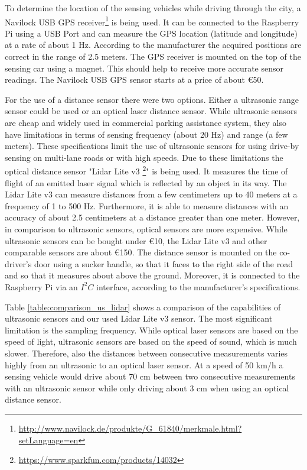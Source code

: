 To determine the location of the sensing vehicles while driving through the city, a Navilock USB GPS receiver\footnote{\url{http://www.navilock.de/produkte/G_61840/merkmale.html?setLanguage=en}} is being used. It can be connected to the Raspberry Pi using a USB Port and can measure the GPS location (latitude and longitude) at a rate of about 1 Hz. According to the manufacturer the acquired positions are correct in the range of 2.5 meters. The GPS receiver is mounted on the top of the sensing car using a magnet. This should help to receive more accurate sensor readings. The Navilock USB GPS sensor starts at a price of about \euro{50}.

For the use of a distance sensor there were two options. Either a ultrasonic range sensor could be used or an optical laser distance sensor. While ultrasonic sensors are cheap and widely used in commercial parking assistance system, they also have limitations in terms of sensing frequency (about 20 Hz) and range (a few meters). These specifications limit the use of ultrasonic sensors for using drive-by sensing on multi-lane roads or with high speeds.   Due to these limitations the optical distance sensor "Lidar Lite v3 \footnote{\url{https://www.sparkfun.com/products/14032}}" is being used. It measures the time of flight of an emitted laser signal which is reflected by an object in its way. The Lidar Lite v3 can measure distances from a few centimeters up to 40 meters at a frequency of 1 to 500 Hz. Furthermore, it is able to measure distances with an accuracy of about 2.5 centimeters at a distance greater than one meter. However, in comparison to ultrasonic sensors, optical sensors are more expensive. While ultrasonic sensors can be bought under \euro{10}, the Lidar Lite v3 and other comparable sensors are about \euro{150}. The distance sensor is mounted on the co-driver's door using a sucker handle, so that it faces to the right side of the road and so that it measures about \todo{40cm} above the ground. Moreover, it is connected to the Raspberry Pi via an $I^2C$ interface, according to the manufacturer's specifications.

Table \ref{table:comparison_us_lidar} shows a comparison of the capabilities of ultrasonic sensors and our used Lidar Lite v3 sensor. The most significant limitation is the sampling frequency. While optical laser sensors are based on the speed of light, ultrasonic sensors are based on the speed of sound, which is much slower. Therefore, also the distances between consecutive measurements varies highly from an ultrasonic to an optical laser sensor. At a speed of 50 km/h a sensing vehicle would drive about 70 cm between two consecutive measurements with an ultrasonic sensor while only driving about 3 cm when using an optical distance sensor.




